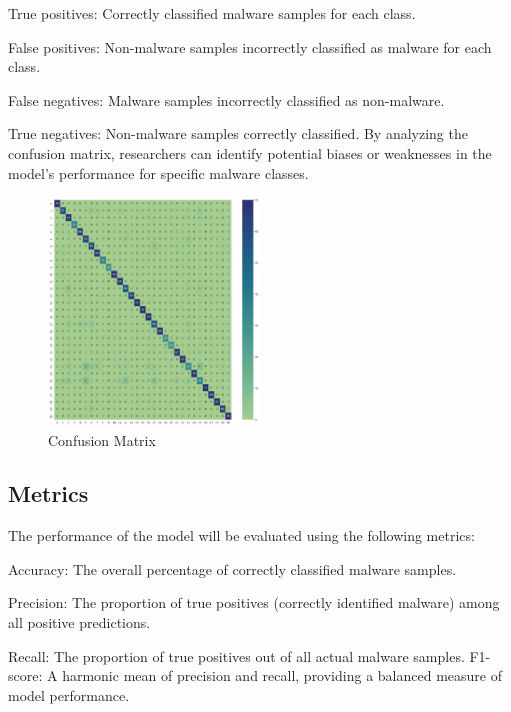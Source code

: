 \documentclass[conference]{IEEEtran}
\begin{document}
        True positives: Correctly classified malware samples for each class.
        
        False positives: Non-malware samples incorrectly classified as malware 
        for each class.

        False negatives: Malware samples incorrectly classified as non-malware.
        
        True negatives: Non-malware samples correctly classified.
    By analyzing the confusion matrix, researchers can identify potential biases or weaknesses in the model's performance for specific malware classes.

\begin{figure}[ht] %
  \centering %
  \includegraphics[width=0.5\textwidth]{confusionmatrixf.jpeg} %
  \caption{Confusion Matrix} %
  \label{fig:example6} %
\end{figure}

\subsection{ Metrics}
The performance of the model will be evaluated using the following metrics:

    Accuracy: The overall percentage of correctly classified malware samples.
    
    Precision: The proportion of true positives (correctly identified malware) among all positive predictions.
    
    Recall: The proportion of true positives out of all actual malware samples.
    F1-score: A harmonic mean of precision and recall, providing a balanced measure of model performance.
\end{document}
